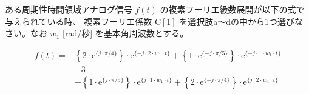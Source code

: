 ある周期性時間領域アナログ信号 $f(t)$ の複素フーリエ級数展開が以下の式で与えられている時、
複素フーリエ係数 $\textrm{C}[1]$ を選択肢a〜dの中から1つ選びなさい。なお $w_1$ [rad/秒] を基本角周波数とする。

\begin{align*}
f(t) =
&  \left \{ 2 \cdot \textrm{e}^{\{ j \cdot \pi/4 \}} \right \} \cdot \textrm{e}^{\{-j \cdot    2 \cdot w_1 \cdot t \}}
 + \left \{ 1 \cdot \textrm{e}^{\{-j \cdot \pi/5 \}} \right \} \cdot \textrm{e}^{\{-j \cdot    1 \cdot w_1 \cdot t \}} \\
&+ 3 \\
&+ \left \{ 1 \cdot \textrm{e}^{\{ j \cdot \pi/5 \}} \right \} \cdot \textrm{e}^{\{ j \cdot    1 \cdot w_1 \cdot t \}} 
 + \left \{ 2 \cdot \textrm{e}^{\{-j \cdot \pi/4 \}} \right \} \cdot \textrm{e}^{\{ j \cdot    2 \cdot w_1 \cdot t \}} 
\end{align*}
